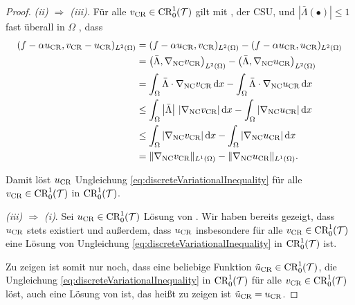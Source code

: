 \begin{proof}
  \bigskip
  \textit{(ii) $\Rightarrow$ (iii).}
  Für alle $v_\textup{CR}\in\textup{CR}^1_0(\mathcal{T})$ gilt mit
  , der CSU,
   und
  $\left|\bar\Lambda(\bullet)\right|\leq 1$ fast überall in $\Omega$ , dass
  \begin{align*}
    (f-\alpha u_\textup{CR},v_\textup{CR}-u_\textup{CR})_{L^2(\Omega)} 
    &= 
    (f-\alpha u_\textup{CR},v_\textup{CR})_{L^2(\Omega)} 
    - (f-\alpha u_\textup{CR},u_\textup{CR})_{L^2(\Omega)} \\
    &=
    \left(\bar\Lambda,\nabla_\textup{NC}v_\textup{CR}\right)_{L^2(\Omega)}
    - \left(\bar\Lambda,\nabla_\textup{NC}u_\textup{CR}\right)_{L^2(\Omega)}\\
    &=
    \int_\Omega\bar\Lambda\cdot\nabla_\textup{NC}v_\textup{CR}\,\mathrm{d}x
    - \int_\Omega\bar\Lambda\cdot\nabla_\textup{NC}u_\textup{CR}\,\mathrm{d}x\\
    &\leq 
    \int_\Omega\left|\bar\Lambda\right|\,|\nabla_\textup{NC}v_\textup{CR}|\,\mathrm{d}x
    - \int_\Omega|\nabla_\textup{NC}u_\textup{CR}|\,\mathrm{d}x\\
    &\leq 
    \int_\Omega|\nabla_\textup{NC}v_\textup{CR}|\,\mathrm{d}x
    - \int_\Omega|\nabla_\textup{NC}u_\textup{CR}|\,\mathrm{d}x\\
    &=
    \Vert\nabla_\textup{NC}v_\textup{CR}\Vert_{L^1(\Omega)}
    -\Vert\nabla_\textup{NC}u_\textup{CR}\Vert_{L^1(\Omega)}.
  \end{align*}

  Damit löst $u_\textup{CR}$ Ungleichung \eqref{eq:discreteVariationalInequality}
  für alle $v_\textup{CR}\in\textup{CR}^1_0(\mathcal{T})$ in $\textup{CR}^1_0(\mathcal{T})$.

  \bigskip
  \textit{(iii) $\Rightarrow$ (i)}.
  Sei $u_\textup{CR}\in\textup{CR}^1_0(\mathcal{T})$ Lösung von
  .
  Wir haben bereits gezeigt, dass $u_\textup{CR}$ stets existiert und außerdem, dass
  $u_\textup{CR}$ insbesondere für alle $v_\textup{CR}\in\textup{CR}^1_0(\mathcal{T})$ eine Lösung von
  Ungleichung \eqref{eq:discreteVariationalInequality} in $\textup{CR}^1_0(\mathcal{T})$ ist.

  Zu zeigen ist somit nur noch, dass eine beliebige Funktion
  $\tilde{u}_{\textup{CR}}\in\textup{CR}^1_0(\mathcal{T})$, die
  Ungleichung \eqref{eq:discreteVariationalInequality} in $\textup{CR}^1_0(\mathcal{T})$ für
  alle $v_\textup{CR}\in\textup{CR}^1_0(\mathcal{T})$ löst, auch eine Lösung von
   ist, das heißt zu zeigen ist
  $\tilde{u}_{\textup{CR}}=u_\textup{CR}$.


\end{proof}
